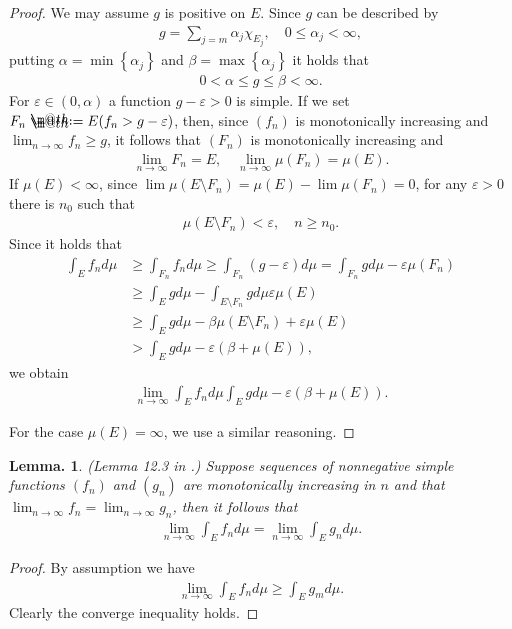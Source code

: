 \documentclass[openany, a4paper, oneside]{book}
\makeatletter
\newcommand*{\defeq}{\mathrel{\rlap{%
\raisebox{0.3ex}{$\m@th\cdot$}}%
\raisebox{-0.3ex}{$\m@th\cdot$}}%
=}
\theoremstyle{break}
\newtheorem{lem}[thm]{Lemma.}
\theoremstyle{breakdefn}
\newcommand{\rbk}[1]{\left (#1\right)}
\newcommand{\cbk}[1]{\left\{#1\right\}}
\makeatother
\begin{document}
\begin{proof}
We may assume $g$ is positive on $E$.
Since $g$ can be described by
\begin{align}
 g
 =
 \sum_{j=m} \alpha_j \chi_{E_j}, \quad 0 \leq \alpha_j < \infty,
\end{align}
putting $\alpha = \min \cbk{\alpha_j}$ and $\beta = \max \cbk{\alpha_j}$ it holds that
\begin{align}
 0 < \alpha \leq g \leq \beta < \infty.
\end{align}
For $\varepsilon \in (0, \alpha)$ a function $g - \varepsilon > 0$ is simple.
If we set $F_n \defeq E (f_n > g - \varepsilon)$, then, since $(f_n)$ is monotonically increasing and $\lim_{n \to \infty} f_n \geq g$, it follows that
$(F_n)$ is monotonically increasing and
\begin{align}
 \lim_{n \to \infty} F_n = E, \quad
 \lim_{n \to \infty} \mu (F_n) = \mu (E).
\end{align}
If $\mu (E) < \infty$, since $\lim \mu (E \setminus F_n) = \mu (E) - \lim \mu (F_n) = 0$, for any $\varepsilon > 0$ there is $n_0$ such that
\begin{align}
 \mu \rbk{E \setminus F_n} < \varepsilon, \quad n \geq n_0.
\end{align}
Since it holds that
\begin{align}
 \int_E f_n d \mu
 &\geq \int_{F_n} f_n d \mu
 \geq
 \int_{F_n} (g - \varepsilon) d\mu
 =
 \int_{F_n} g d \mu - \varepsilon \mu (F_n) \\
 &\geq
 \int_E g d \mu - \int_{E \setminus F_n} g d \mu \varepsilon \mu (E) \\
 &\geq
 \int_E g d \mu - \beta \mu \rbk{E \setminus F_n} + \varepsilon \mu (E) \\
 &>
 \int_E g d \mu - \varepsilon \rbk{ \beta + \mu (E)},
\end{align}
we obtain
\begin{align}
 \lim_{n \to \infty} \int_E f_n d \mu
 \int_E g d\mu - \varepsilon \rbk{\beta + \mu (E)}.
\end{align}

For the case $\mu (E) = \infty$, we use a similar reasoning.
\end{proof}

\begin{lem}\textup{(Lemma 12.3 in \cite{SeizoIto1}.)}
 Suppose sequences of nonnegative simple functions $(f_n)$ and $(g_n)$ are monotonically increasing in $n$
 and that $\lim_{n \to \infty} f_n = \lim_{n \to \infty} g_n$, then it follows that
 \begin{align}
  \lim_{n \to \infty} \int_E f_n d \mu
  =
  \lim_{n \to \infty} \int_E g_n d \mu.
 \end{align}
\end{lem}
\begin{proof}
By assumption we have
\begin{align}
 \lim_{n \to \infty} \int_E f_n d\mu
 \geq
 \int_E g_m d \mu.
\end{align}
Clearly the converge inequality holds.
\end{proof}
\end{document}
